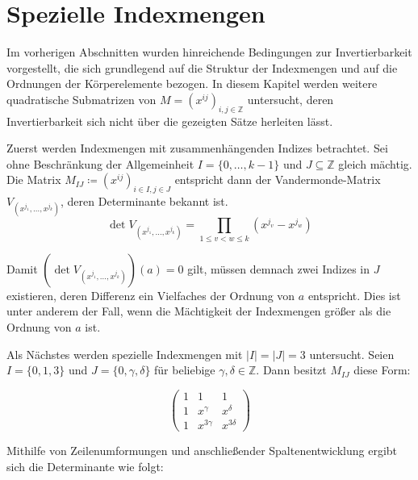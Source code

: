 \section{Spezielle Indexmengen} \label{sec:spezielleIndexmengen}

Im vorherigen Abschnitten wurden hinreichende Bedingungen zur Invertierbarkeit vorgestellt, die sich grundlegend auf die Struktur der Indexmengen und auf die Ordnungen der Körperelemente bezogen. In diesem Kapitel werden weitere quadratische Submatrizen von $M = \left( x^{ij} \right)_{i,j \in \mathbb{Z}}$ untersucht, deren Invertierbarkeit sich nicht über die gezeigten Sätze herleiten lässt.

Zuerst werden Indexmengen mit zusammenhängenden Indizes betrachtet. Sei ohne Beschränkung der Allgemeinheit $I = \{0,\dots,k-1\}$ und $J \subseteq \mathbb{Z}$ gleich mächtig. Die Matrix $M_{IJ} \coloneqq \left( x^{ij} \right)_{i \in I,j \in J}$ entspricht dann der Vandermonde-Matrix $V_{(x^{j_1},\dots,x^{j_k})}$, deren Determinante bekannt ist. \cite{VandermondeDet}
\begin{equation*}
    \det V_{(x^{j_1},\dots,x^{j_k})} = \prod_{1\leq v<w\leq k} (x^{j_v} - x^{j_w})
\end{equation*}


Damit $(\det V_{(x^{j_1},\dots,x^{j_k})})(a) = 0$ gilt, müssen demnach zwei Indizes in $J$ existieren, deren Differenz ein Vielfaches der Ordnung von $a$ entspricht. Dies ist unter anderem der Fall, wenn die Mächtigkeit der Indexmengen größer als die Ordnung von $a$ ist.

\begin{sloppypar}
    Als Nächstes werden spezielle Indexmengen mit $|I| = |J| = 3$ untersucht. Seien ${I = \{0, 1, 3\}}$ und $J = \{0, \gamma, \delta\}$ für beliebige $\gamma,\delta \in \mathbb{Z}$. Dann besitzt $M_{IJ}$ diese Form:
\end{sloppypar}
\begin{equation*}
    \begin{pmatrix}
        1 & 1 & 1 \\
        1 & x^{\gamma} & x^{\delta} \\
        1 & x^{3\gamma} & x^{3\delta}
    \end{pmatrix}
\end{equation*}

Mithilfe von Zeilenumformungen und anschließender Spaltenentwicklung ergibt sich die Determinante wie folgt:

